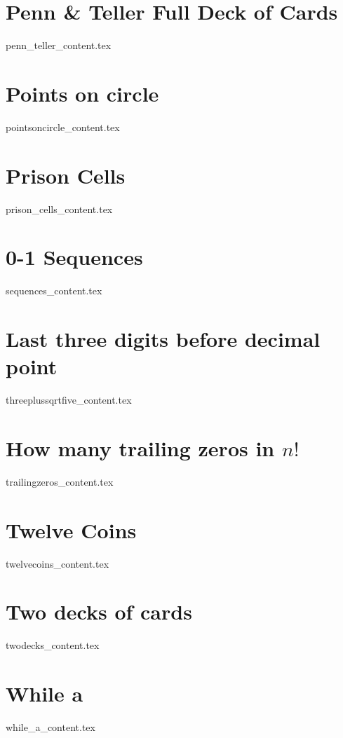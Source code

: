 \documentclass[justified, openany]{tufte-book}
\theoremstyle{plain}%
\theoremstyle{definition}
\theoremstyle{remark}
\begin{document}
\clearpage
\chapter{Penn \& Teller Full Deck of Cards}
{penn_teller_content.tex}

\clearpage
\chapter{Points on circle}
{pointsoncircle_content.tex}

\clearpage
\chapter{Prison Cells}
{prison_cells_content.tex}

\clearpage
\chapter{0-1 Sequences}
{sequences_content.tex}

\clearpage
\chapter{Last three digits before decimal point}
{threeplussqrtfive_content.tex}

\clearpage
\chapter{How many trailing zeros in $n!$}
{trailingzeros_content.tex}

\clearpage
\chapter{Twelve Coins}
{twelvecoins_content.tex}

\clearpage
\chapter{Two decks of cards}
{twodecks_content.tex}

\clearpage
\chapter{While a}
{while_a_content.tex}
\end{document}

